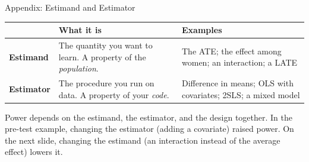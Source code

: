 \documentclass[
  ignorenonframetext,
  aspectratio=169,
]{beamer}
\begin{document}
\begin{frame}{Appendix: Estimand and Estimator}
\label{appendix-estimand-and-estimator}
\vspace{0.4em}

\begin{center}
\small
\setlength{\tabcolsep}{7pt}
\renewcommand{\arraystretch}{1.25}
\begin{tabular}{>{\raggedright\arraybackslash}p{2.2cm}>{\raggedright\arraybackslash}p{5.0cm}>{\raggedright\arraybackslash}p{5.6cm}}
\toprule
& \textbf{What it is} & \textbf{Examples} \\
\midrule
\textbf{Estimand}  & The quantity you want to learn. A property of the \textit{population}. & The ATE; the effect among women; an interaction; a LATE \\
\textbf{Estimator} & The procedure you run on data. A property of your \textit{code}. & Difference in means; OLS with covariates; 2SLS; a mixed model \\
\bottomrule
\end{tabular}
\end{center}

\vspace{0.6em}

\small Power depends on the estimand, the estimator, and the design
together. In the pre-test example, changing the estimator (adding a
covariate) raised power. On the next slide, changing the estimand (an
interaction instead of the average effect) lowers it.
\end{frame}
\end{document}
